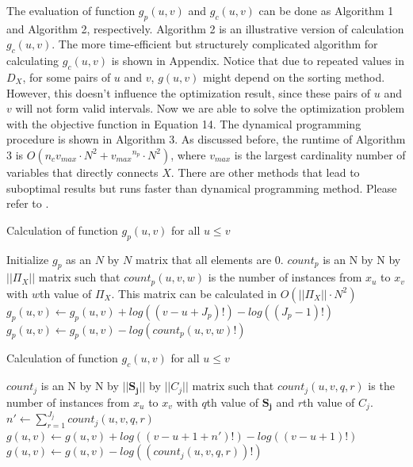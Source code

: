 The evaluation of function $g_p(u,v)$ and $g_c(u,v)$ can be done as Algorithm 1 and Algorithm 2, respectively. Algorithm 2 is an illustrative version of calculation $g_c(u,v)$. The more time-efficient but structurely complicated algorithm for calculating $g_c(u,v)$ is shown in Appendix. Notice that due to repeated values in $D_X$, for some pairs of $u$ and $v$, $g(u,v)$ might depend on the sorting method. However, this doesn't influence the optimization result, since these pairs of $u$ and $v$ will not form valid intervals. Now we are able to solve the optimization problem with the objective function in Equation 14. The dynamical programming procedure is shown in Algorithm 3. As discussed before, the runtime of Algorithm 3 is $O(n_c  {v_{max}} \cdot N^2 + {v_{max}}^{n_p} \cdot N^2)$, where $v_{max}$ is the largest cardinality number of variables that directly connects $X$. There are other methods that lead to suboptimal results but runs faster than dynamical programming method. Please refer to \citep{Boulle_2006}.
\begin{algorithm}
\caption{ Calculation of function $g_p(u,v)$ for all $u \leq v$}\label{euclid}
\begin{algorithmic}[1]
\State Initialize $g_p$ as an $N$ by $N$ matrix that all elements are 0.
\State $count_p$ is an N by N by $||\Pi_X||$ matrix such that $count_p (u,v,w)$ is the number of instances from $x_u$ to $x_v$ with $w$th value of $\Pi_X$. This matrix can be calculated in $O(||\Pi_X|| \cdot N^2)$
\State $g_p(u,v) \leftarrow g_p(u,v) + log((v-u + J_p)!) - log((J_p -1)!)$
\State $g_p(u,v) \leftarrow g_p(u,v) - log( count_p(u,v,w)!)$
\EndFor 
\EndFor
\EndFor
\end{algorithmic}
\end{algorithm}

\begin{algorithm}
\caption{ Calculation of function $g_c(u,v)$ for all $u \leq v$}\label{euclid}
\begin{algorithmic}[1]
\State $count_j$ is an N by N by $||\boldsymbol{S_j}||$ by $||C_j||$ matrix such that $count_j (u,v,q,r)$ is the number of instances from $x_u$ to $x_v$ with $q$th value of $\boldsymbol{S_j}$ and $r$th value of $C_j$.
\State $n' \leftarrow  \sum_{r=1}^{J_j} count_j (u,v,q,r)$
\State $g(u,v) \leftarrow g(u,v) + log(( v - u + 1 + n')!) - log((v-u+1)!)$
\State $g(u,v) \leftarrow g(u,v) - log((count_j (u,v,q,r))!)$
\EndFor
\EndFor
\EndFor
\EndFor
\EndFor
\end{algorithmic}
\end{algorithm}

